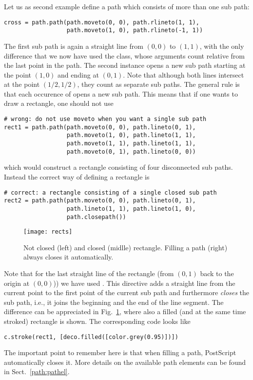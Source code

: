 Let us as second example define a path which consists of more than 
one sub path:
\begin{verbatim}
cross = path.path(path.moveto(0, 0), path.rlineto(1, 1),
                  path.moveto(1, 0), path.rlineto(-1, 1))
\end{verbatim}
The first sub path is again a straight line from $(0, 0)$ to $(1, 1)$,
with the only difference that we now have used the 
class, whose arguments count relative from the last point in the path.
The second  instance opens a new sub path starting at the
point $(1, 0)$ and ending at $(0, 1)$. Note that although both lines
intersect at the point $(1/2, 1/2)$, they count as separate sub paths.
The general rule is that each occurence of  opens a new
sub path. This means that if one wants to draw a rectangle, one should
not use
\begin{verbatim}
# wrong: do not use moveto when you want a single sub path
rect1 = path.path(path.moveto(0, 0), path.lineto(0, 1),
                  path.moveto(1, 0), path.lineto(1, 1),
                  path.moveto(1, 1), path.lineto(1, 1),
                  path.moveto(0, 1), path.lineto(0, 0))
\end{verbatim}
which would construct a rectangle consisting of four disconnected
sub paths. Instead the correct way of defining a rectangle is 
\begin{verbatim}
# correct: a rectangle consisting of a single closed sub path
rect2 = path.path(path.moveto(0, 0), path.lineto(0, 1), 
                  path.lineto(1, 1), path.lineto(1, 0),
                  path.closepath())
\end{verbatim}
%
\begin{figure}
\centerline{\texttt{[image: rects]}}
\caption{Not closed (left) and closed (midlle) rectangle. Filling a
  path (right) always closes it automatically.}
\label{fig:rects}
\end{figure}
Note that for the last straight line of the rectangle (from $(0, 1)$
back to the origin at $(0, 0)$)) we have used .  This
directive adds a straight line from the current point to the first
point of the current sub path and furthermore \textit{closes} the sub
path, i.e., it joins the beginning and the end of the line segment.
The difference can be appreciated in Fig.~\ref{fig:rects}, where
also a filled (and at the same time stroked) rectangle is shown.
The corresponding code looks like
\begin{verbatim}
c.stroke(rect1, [deco.filled([color.grey(0.95)])])
\end{verbatim}
The important point to remember here is that when filling a path,
PostScript automatically closes it.  More details on the available
path elements can be found in Sect.~\ref{path:pathel}.

